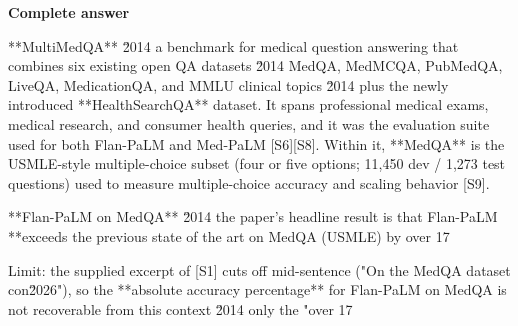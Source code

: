 \documentclass[10pt]{article}
\begin{document}
\textbf{Complete answer}
\begin{AnswerText}
**MultiMedQA** \u2014 a benchmark for medical question answering that combines six existing open QA datasets \u2014 MedQA, MedMCQA, PubMedQA, LiveQA, MedicationQA, and MMLU clinical topics \u2014 plus the newly introduced **HealthSearchQA** dataset. It spans professional medical exams, medical research, and consumer health queries, and it was the evaluation suite used for both Flan-PaLM and Med-PaLM [S6][S8]. Within it, **MedQA** is the USMLE-style multiple-choice subset (four or five options; 11,450 dev / 1,273 test questions) used to measure multiple-choice accuracy and scaling behavior [S9].

**Flan-PaLM on MedQA** \u2014 the paper's headline result is that Flan-PaLM **exceeds the previous state of the art on MedQA (USMLE) by over 17%

Limit: the supplied excerpt of [S1] cuts off mid-sentence ("On the MedQA dataset con\u2026"), so the **absolute accuracy percentage** for Flan-PaLM on MedQA is not recoverable from this context \u2014 only the "over 17%
\end{AnswerText}
\end{document}
